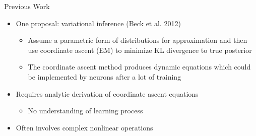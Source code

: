 \documentclass{beamer}
\begin{document}
\begin{frame}{Previous Work}
  \begin{itemize}
  \item
  	One proposal: variational inference (Beck et al. 2012)
   \begin{itemize}
    \item
    	Assume a parametric form of distributions for approximation and then use coordinate ascent (EM) to minimize KL divergence to true posterior
   \item
   	The coordinate ascent method produces dynamic equations which could be implemented by neurons after a lot of training
  \end{itemize}
    \item
   	Requires analytic derivation of coordinate ascent equations
   \begin{itemize}
    \item
    	No understanding of learning process
  \end{itemize}
     \item
     	Often involves complex nonlinear operations
   \end{itemize}
\end{frame}
\end{document}
